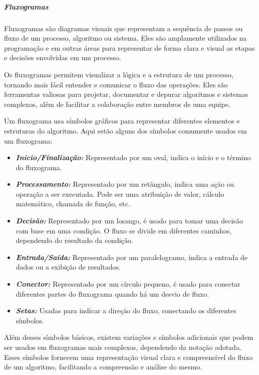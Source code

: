 \documentclass[a4paper, 12pt, onecolumn,singlespacing]{article}
\begin{document}
	\subparagraph{Fluxogramas}
	\label{fluxogramas}
	Fluxogramas são diagramas visuais que representam a sequência de passos ou fluxo de um processo, algoritmo ou sistema. Eles são amplamente utilizados na programação e em outras áreas para representar de forma clara e visual as etapas e decisões envolvidas em um processo.
	
	Os fluxogramas permitem visualizar a lógica e a estrutura de um processo, tornando mais fácil entender e comunicar o fluxo das operações. Eles são ferramentas valiosas para projetar, documentar e depurar algoritmos e sistemas complexos, além de facilitar a colaboração entre membros de uma equipe.
	
	Um fluxograma usa símbolos gráficos para representar diferentes elementos e estruturas do algoritmo. Aqui estão alguns dos símbolos comumente usados em um fluxograma:
	
	\begin{itemize}
		\item \textbf{\textit{Início/Finalização:}} Representado por um oval, indica o início e o término do fluxograma.
		
		\item \textbf{\textit{Processamento:}} Representado por um retângulo, indica uma ação ou operação a ser executada. Pode ser uma atribuição de valor, cálculo matemático, chamada de função, etc.
		
		\item \textbf{\textit{Decisão:}} Representado por um losango, é usado para tomar uma decisão com base em uma condição. O fluxo se divide em diferentes caminhos, dependendo do resultado da condição.
		
		\item \textbf{\textit{Entrada/Saída:}} Representado por um paralelogramo, indica a entrada de dados ou a exibição de resultados.
		
		\item \textbf{\textit{Conector:}} Representado por um círculo pequeno, é usado para conectar diferentes partes do fluxograma quando há um desvio de fluxo.
		
		\item \textbf{\textit{Setas:}} Usadas para indicar a direção do fluxo, conectando os diferentes símbolos.
		
	\end{itemize}
	
	Além desses símbolos básicos, existem variações e símbolos adicionais que podem ser usados em fluxogramas mais complexos, dependendo da notação adotada. Esses símbolos fornecem uma representação visual clara e compreensível do fluxo de um algoritmo, facilitando a compreensão e análise do mesmo.
	
\end{document}
